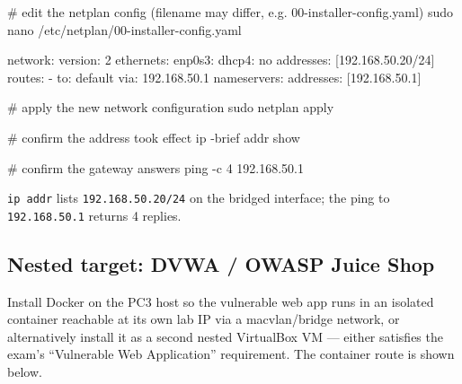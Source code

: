 \documentclass[11pt,a4paper]{article}
\begin{document}
\begin{cmdbox}
\begin{cmdverb}
# edit the netplan config (filename may differ, e.g. 00-installer-config.yaml)
sudo nano /etc/netplan/00-installer-config.yaml
\end{cmdverb}
\end{cmdbox}

\begin{cmdbox}
\begin{cmdverb}
network:
  version: 2
  ethernets:
    enp0s3:
      dhcp4: no
      addresses: [192.168.50.20/24]
      routes:
        - to: default
          via: 192.168.50.1
      nameservers:
        addresses: [192.168.50.1]
\end{cmdverb}
\end{cmdbox}

\begin{cmdbox}
\begin{cmdverb}
# apply the new network configuration
sudo netplan apply

# confirm the address took effect
ip -brief addr show

# confirm the gateway answers
ping -c 4 192.168.50.1
\end{cmdverb}
\end{cmdbox}

\begin{expectbox}
\texttt{ip addr} lists \texttt{192.168.50.20/24} on the bridged interface; the ping to
\texttt{192.168.50.1} returns 4 replies.
\end{expectbox}

\subsection{Nested target: DVWA / OWASP Juice Shop}
\begin{steps}
\item Install Docker on the PC3 host so the vulnerable web app runs in an isolated
  container reachable at its own lab IP via a macvlan/bridge network, or alternatively
  install it as a second nested VirtualBox VM --- either satisfies the exam's
  ``Vulnerable Web Application'' requirement. The container route is shown below.
\end{steps}
\end{document}
